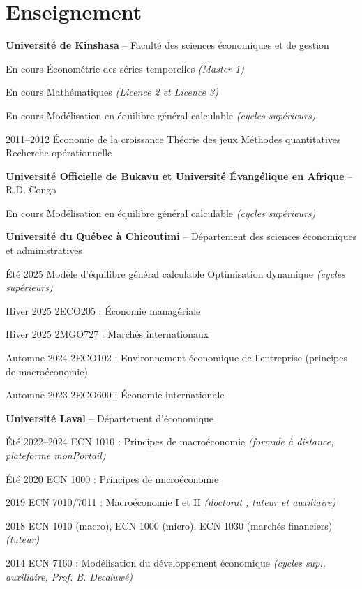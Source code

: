 \documentclass[11pt,letterpaper]{article}
\newenvironment{datelist}
  {\begin{description}[style=multiline,leftmargin=2.75cm,labelwidth=2.55cm,
     labelsep=0.2cm,font=\normalfont\small\color{soft},
     itemsep=0.45em,topsep=0.25em,parsep=0.15em]}
  {\end{description}}
\newcommand{\dotsep}{\;\textcolor{soft}{\textbullet}\;}
\newcommand{\meta}[1]{{\small\itshape\color{soft}#1}}
\begin{document}
\section{Enseignement}
\textbf{Université de Kinshasa} -- Faculté des sciences économiques et de gestion
\begin{datelist}
  \item[En cours] Économétrie des séries temporelles \meta{(Master 1)}
  \item[En cours] Mathématiques \meta{(Licence 2 et Licence 3)}
  \item[En cours] Modélisation en équilibre général calculable \meta{(cycles supérieurs)}
  \item[2011--2012] Économie de la croissance \dotsep Théorie des jeux \dotsep Méthodes quantitatives \dotsep Recherche opérationnelle
\end{datelist}
\textbf{Université Officielle de Bukavu et Université Évangélique en Afrique} -- R.D. Congo
\begin{datelist}
  \item[En cours] Modélisation en équilibre général calculable \meta{(cycles supérieurs)}
\end{datelist}
\textbf{Université du Québec à Chicoutimi} -- Département des sciences économiques et administratives
\begin{datelist}
  \item[Été 2025] Modèle d'équilibre général calculable \dotsep Optimisation dynamique \meta{(cycles supérieurs)}
  \item[Hiver 2025] 2ECO205 : Économie managériale
  \item[Hiver 2025] 2MGO727 : Marchés internationaux
  \item[Automne 2024] 2ECO102 : Environnement économique de l'entreprise (principes de macroéconomie)
  \item[Automne 2023] 2ECO600 : Économie internationale
\end{datelist}
\textbf{Université Laval} -- Département d'économique
\begin{datelist}
  \item[Été 2022--2024] ECN 1010 : Principes de macroéconomie \meta{(formule à distance, plateforme monPortail)}
  \item[Été 2020] ECN 1000 : Principes de microéconomie
  \item[2019] ECN 7010/7011 : Macroéconomie I et II \meta{(doctorat ; tuteur et auxiliaire)}
  \item[2018] ECN 1010 (macro), ECN 1000 (micro), ECN 1030 (marchés financiers) \meta{(tuteur)}
  \item[2014] ECN 7160 : Modélisation du développement économique \meta{(cycles sup., auxiliaire, Prof. B. Decaluwé)}
\end{datelist}
\end{document}
